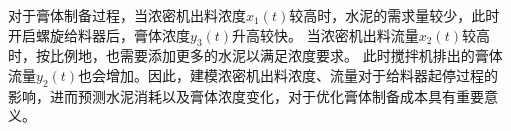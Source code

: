 
对于膏体制备过程，当浓密机出料浓度$x_1(t)$较高时，水泥的需求量较少，此时开启螺旋给料器后，膏体浓度$y_3(t)$升高较快。
当浓密机出料流量$x_2(t)$较高时，按比例地，也需要添加更多的水泥以满足浓度要求。
此时搅拌机排出的膏体流量$y_2(t)$也会增加。因此，建模浓密机出料浓度、流量对于给料器起停过程的影响，进而预测水泥消耗以及膏体浓度变化，对于优化膏体制备成本具有重要意义。




